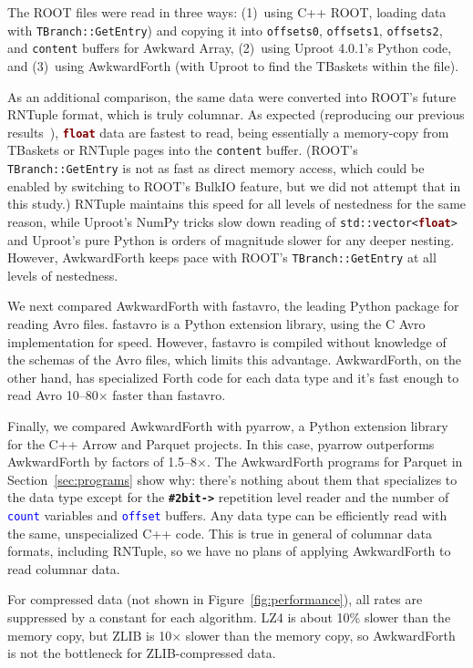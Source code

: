 \documentclass{webofc}
\begin{document}
The ROOT files were read in three ways: (1)~using C++ ROOT, loading data with {\tt TBranch::GetEntry}) and copying it into {\tt offsets0}, {\tt offsets1}, {\tt offsets2}, and {\tt content} buffers for Awkward Array, (2)~using Uproot 4.0.1's Python code, and (3)~using AwkwardForth (with Uproot to find the TBaskets within the file).

As an additional comparison, the same data were converted into ROOT's future RNTuple format, which is truly columnar. As expected (reproducing our previous results~\cite{chep2019}), \textcolor{Maroon}{\tt\textbf{float}} data are fastest to read, being essentially a memory-copy from TBaskets or RNTuple pages into the {\tt content} buffer. (ROOT's {\tt TBranch::GetEntry} is not as fast as direct memory access, which could be enabled by switching to ROOT's BulkIO feature, but we did not attempt that in this study.) RNTuple maintains this speed for all levels of nestedness for the same reason, while Uproot's NumPy tricks slow down reading of {\tt std::vector<\textcolor{Maroon}{\textbf{float}}>} and Uproot's pure Python is orders of magnitude slower for any deeper nesting. However, AwkwardForth keeps pace with ROOT's {\tt TBranch::GetEntry} at all levels of nestedness.

We next compared AwkwardForth with fastavro, the leading Python package for reading Avro files. fastavro is a Python extension library, using the C Avro implementation for speed. However, fastavro is compiled without knowledge of the schemas of the Avro files, which limits this advantage. AwkwardForth, on the other hand, has specialized Forth code for each data type and it's fast enough to read Avro 10--80$\times$ faster than fastavro.

Finally, we compared AwkwardForth with pyarrow, a Python extension library for the C++ Arrow and Parquet projects. In this case, pyarrow outperforms AwkwardForth by factors of 1.5--8$\times$. The AwkwardForth programs for Parquet in Section~\ref{sec:programs} show why: there's nothing about them that specializes to the data type except for the \textcolor{OliveGreen}{\tt\textbf{\#2bit->}} repetition level reader and the number of \textcolor{blue}{\tt count} variables and \textcolor{blue}{\tt offset} buffers. Any data type can be efficiently read with the same, unspecialized C++ code. This is true in general of columnar data formats, including RNTuple, so we have no plans of applying AwkwardForth to read columnar data.

For compressed data (not shown in Figure~\ref{fig:performance}), all rates are suppressed by a constant for each algorithm. LZ4 is about 10\% slower than the memory copy, but ZLIB is 10$\times$ slower than the memory copy, so AwkwardForth is not the bottleneck for ZLIB-compressed data.
\end{document}
